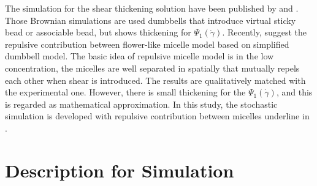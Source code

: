 \documentclass[10pt, a4paper]{article}
\begin{document}
The simulation for the shear thickening solution have been published by \textcite{VandenBrule:1995ul} and \textcites{HernandezCifre:2003jza, HernandezCifre:2007cb}. Those Brownian simulations are used dumbbells that introduce virtual sticky bead or associable bead, but shows thickening for $\Psi_1(\dot{\gamma})$. Recently, \textcite{Ianniruberto:2015dv} suggest the repulsive contribution between flower-like micelle model based on simplified dumbbell model. The basic idea of repulsive micelle model is in the low concentration, the micelles are well separated in spatially that mutually repels each other when shear is introduced. The results are qualitatively matched with the experimental one. However, there is small thickening for the $\Psi_1(\dot{\gamma})$, and this is regarded as mathematical approximation. In this study, the stochastic simulation is developed with repulsive contribution between micelles underline in \textcite{Ianniruberto:2015dv}.

\section{Description for Simulation}
\end{document}

